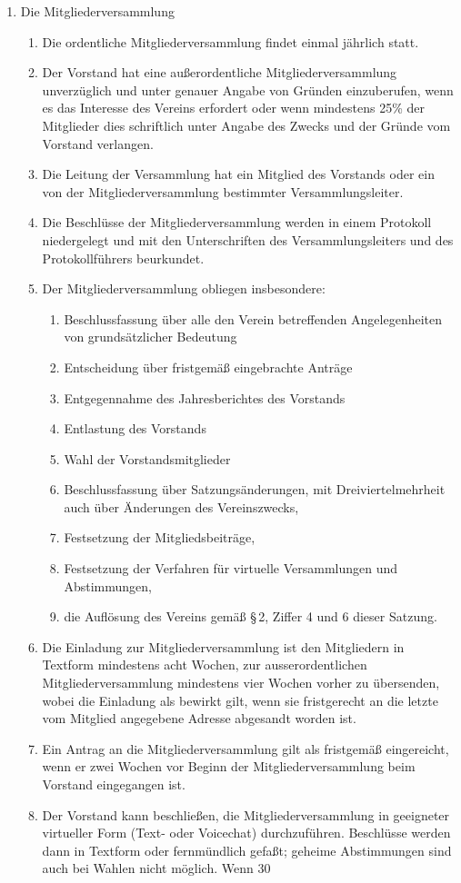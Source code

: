 \documentclass[12pt,a4paper]{article}
\begin{document}
\begin{enumerate}
\item Die Mitgliederversammlung
\begin{enumerate}
\item Die ordentliche Mitgliederversammlung findet einmal jährlich statt.
\item Der Vorstand hat eine außerordentliche Mitgliederversammlung unverzüglich und unter genauer Angabe von Gründen einzuberufen, wenn es das Interesse des Vereins erfordert oder wenn mindestens 25\% der Mitglieder dies schriftlich unter Angabe des Zwecks und der Gründe vom Vorstand verlangen.
\item Die Leitung der Versammlung hat ein Mitglied des Vorstands oder ein von der Mitgliederversammlung bestimmter Versammlungsleiter.
\item Die Beschlüsse der Mitgliederversammlung werden in einem Protokoll niedergelegt und mit den Unterschriften des Versammlungsleiters und des Protokollführers beurkundet.
\item Der Mitgliederversammlung obliegen insbesondere:
\begin{enumerate}
\item Beschlussfassung über alle den Verein betreffenden Angelegenheiten von grundsätzlicher Bedeutung
\item Entscheidung über fristgemäß eingebrachte Anträge
\item Entgegennahme des Jahresberichtes des Vorstands
\item Entlastung des Vorstands
\item Wahl der Vorstandsmitglieder
\item Beschlussfassung über Satzungsänderungen, mit Dreiviertelmehrheit auch über Änderungen des Vereinszwecks,
\item Festsetzung der Mitgliedsbeiträge,
\item Festsetzung der Verfahren für virtuelle Versammlungen und Abstimmungen, 
\item die Auflösung des Vereins gemäß §\,2, Ziffer 4 und 6 dieser Satzung.
\end{enumerate}
\item Die Einladung zur Mitgliederversammlung ist den Mitgliedern in Textform mindestens acht Wochen,‭ ‬zur ausserordentlichen Mitgliederversammlung mindestens vier Wochen vorher zu übersenden,‭ ‬wobei die Einladung als bewirkt gilt,‭ ‬wenn sie fristgerecht‭ ‬an die letzte vom Mitglied angegebene Adresse abgesandt worden ist.
\item Ein Antrag an die Mitgliederversammlung gilt als fristgemäß eingereicht, wenn er zwei Wochen vor Beginn der Mitgliederversammlung beim Vorstand eingegangen ist.
\item Der Vorstand kann beschließen, die Mitgliederversammlung in geeigneter virtueller Form (Text- oder Voicechat) durchzuführen. Beschlüsse werden dann in Textform oder fernmündlich gefaßt; geheime Abstimmungen sind auch bei Wahlen nicht möglich. Wenn 30%
\end{enumerate}
\end{enumerate}
\end{document}
